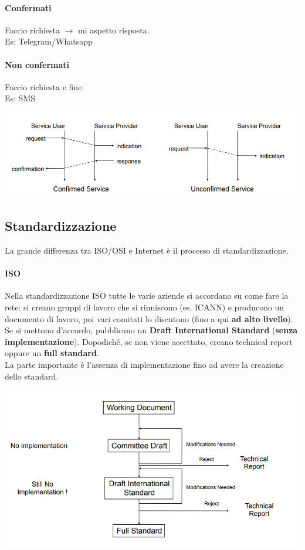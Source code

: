 \documentclass[10pt]{book}
\begin{document}
\paragraph{Confermati} Faccio richiesta $\rightarrow$ mi aspetto risposta.\\Es: Telegram/Whatsapp
\paragraph{Non confermati} Faccio richiesta e fine.\\Es: SMS
\begin{center}
	\includegraphics[scale=0.7]{timediag.png}
\end{center}
\subsection{Standardizzazione}
La grande differenza tra ISO/OSI e Internet è il processo di standardizzazione.
\pagebreak
\paragraph{ISO} Nella standardizzazione ISO tutte le varie aziende si accordano su come fare la rete: si creano gruppi di lavoro che si riuniscono (es. ICANN) e producono un documento di lavoro, poi vari comitati lo discutono (fino a qui \textbf{ad alto livello}).\\
Se si mettono d'accordo, pubblicano un \textbf{Draft International Standard} (\textbf{senza implementazione}). Dopodiché, se non viene accettato, creano technical report oppure un \textbf{full standard}.\\
La parte importante è l'assenza di implementazione fino ad avere la creazione dello standard.

\begin{center}
	\includegraphics[scale=0.7]{stdiso.png}
\end{center}
\end{document}

